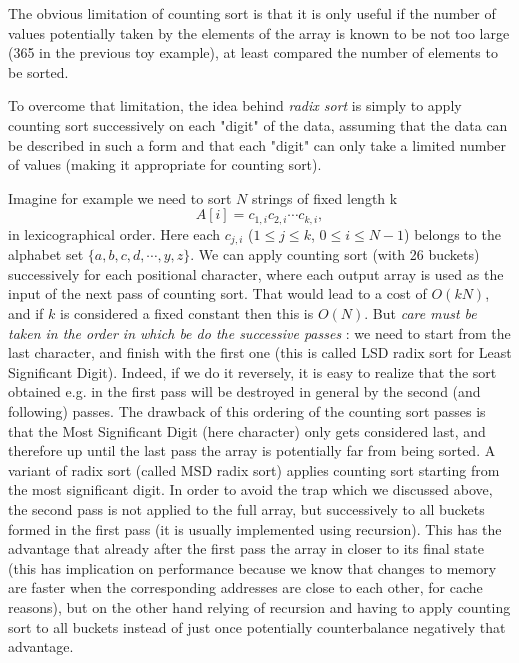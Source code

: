 \documentclass[12pt]{article}
\theoremstyle{plain}
\theoremstyle{remark}
\begin{document}
The obvious limitation of counting sort is that it is only useful if the
number of values potentially taken by the elements of the array is known to
be not too large (365 in the previous toy example), at least compared 
the number of elements to be sorted.


To overcome that limitation, the idea behind {\it radix sort} is simply to 
apply counting sort successively on each "digit" of the data, assuming that the
data can be described in such a form and that each "digit" can only take a limited
number of values (making it appropriate for counting sort).

Imagine for example we need to sort $N$ strings of fixed length k 
$$
A[i] = c_{1,i}c_{2,i}\cdots c_{k,i},
$$
in lexicographical order. Here each $c_{j,i}$ ($1\leq j \leq k$, $0\leq i \leq N-1$) 
belongs to the alphabet set $\{a, b ,c ,d, \cdots, y, z\}$.
We can apply counting sort (with 26 buckets) successively for each positional 
character, where each output array is used as the input of the next pass of counting
sort. That would lead to a cost of $O(kN)$, and if $k$ is considered a fixed
constant then this is $O(N).$ But {\it care must be taken in the order in 
which be do the successive passes} : we need
to start from the last character, and finish with the first one (this is called 
LSD radix sort for Least Significant Digit). Indeed, if we do it reversely, it is
easy to realize that the sort obtained e.g. in the first pass will be destroyed
in general by the second (and following) passes. The drawback of this ordering
of the counting sort passes is that the Most Significant Digit (here character) 
only gets considered last, and therefore up until the last pass the array is
potentially far from being sorted. A variant of radix sort (called MSD radix
sort) applies counting sort starting from the most significant digit. In order
to avoid the trap which we discussed above, the second pass is not applied to
the full array, but successively to all buckets formed in the first pass (it is
usually implemented using recursion). This has the advantage that already after
the first pass the array in closer to its final state (this has implication on
performance because we know that changes to memory are faster when the
corresponding addresses are close to each other, for cache reasons), but on 
the other hand relying of recursion and having to apply counting sort to all 
buckets instead of just once potentially counterbalance negatively that
advantage.

\medskip
\end{document}
